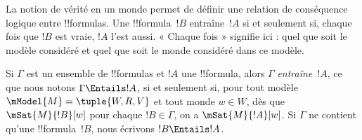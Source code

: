 \documentclass[../../../include/open-logic-section]{subfiles}
\begin{document}


\begin{explain}
  La notion de vérité en un monde permet de définir une relation
  de conséquence logique entre !!{formula}s. Une !!{formula}~$!B$
  entraîne~$!A$ si et seulement si, chaque fois que $!B$ est vraie,
  $!A$ l'est aussi. « Chaque fois » signifie ici : quel que soit
  le modèle considéré et quel que soit le monde considéré dans ce
  modèle.
\end{explain}

\begin{defn}
  Si $\Gamma$ est un ensemble de !!{formula}s et $!A$ une
  !!{formula}, alors $\Gamma$ \emph{entraîne}~$!A$, ce que nous
  notons $\Gamma \Entails !A$, si et seulement si, pour tout
  modèle $\mModel{M} = \tuple{W, R, V}$ et tout monde $w \in W$,
  dès que $\mSat{M}{!B}[w]$ pour chaque $!B \in \Gamma$, on a
  $\mSat{M}{!A}[w]$. Si $\Gamma$ ne contient qu'une
  !!{formula}~$!B$, nous écrivons $!B \Entails !A$.
\end{defn}
\end{document}
